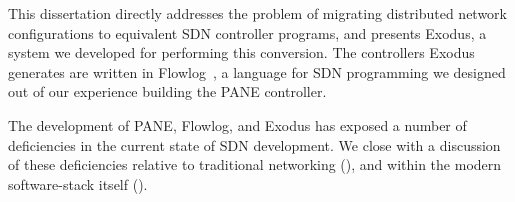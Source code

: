 %
This dissertation directly addresses the problem of migrating distributed network
configurations to equivalent SDN controller programs, and presents Exodus, a
system we developed for performing this conversion.
The controllers Exodus generates are written in Flowlog~\cite{Nelson:2014flowlog},
a language for SDN programming we designed out of our experience building
the PANE controller.

The development of PANE, Flowlog, and Exodus has exposed a number of
deficiencies in the current state of SDN development.
We close with a discussion of these deficiencies relative to traditional networking
(), and within the modern software-stack itself ().

\begin{comment}

\vskip 0.5em

In summary, this thesis makes the following contributions:

\begin{enumerate}


\item We implement a fully-functioning SDN controller which allows a
network's administrators to safely delegate their authority using our API.

\item We analyze a previously proposed algorithm for consolidating
hierarchical policies, and propose a new algorithm that reduces the complexity
from exponential to polynomial.

\item We demonstrate our system's usefulness and
practicality on a real OpenFlow testbed using 
microbenchmarks and four real applications enhanced with our API.


\end{enumerate}

\end{comment}

%
